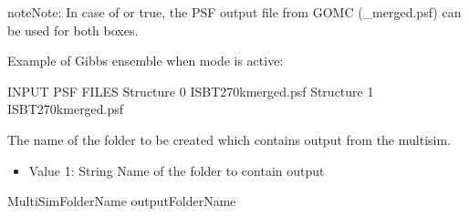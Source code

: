 \documentclass[letterpaper,10pt,english]{sphinxmanual}
\begin{document}
\begin{description}
\begin{sphinxadmonition}{note}{Note:}
In case of  or  true, the PSF output file from GOMC (\_merged.psf) can be used for both boxes.
\end{sphinxadmonition}

Example of Gibbs ensemble when  mode is active:

\begin{sphinxVerbatim}[commandchars=\\\{\}]
\PYGZsh{}\PYGZsh{}\PYGZsh{}\PYGZsh{}\PYGZsh{}\PYGZsh{}\PYGZsh{}\PYGZsh{}\PYGZsh{}\PYGZsh{}\PYGZsh{}\PYGZsh{}\PYGZsh{}\PYGZsh{}\PYGZsh{}\PYGZsh{}\PYGZsh{}\PYGZsh{}\PYGZsh{}\PYGZsh{}\PYGZsh{}\PYGZsh{}\PYGZsh{}\PYGZsh{}\PYGZsh{}\PYGZsh{}\PYGZsh{}\PYGZsh{}\PYGZsh{}\PYGZsh{}\PYGZsh{}\PYGZsh{}\PYGZsh{}
\PYGZsh{} INPUT PSF FILES
\PYGZsh{}\PYGZsh{}\PYGZsh{}\PYGZsh{}\PYGZsh{}\PYGZsh{}\PYGZsh{}\PYGZsh{}\PYGZsh{}\PYGZsh{}\PYGZsh{}\PYGZsh{}\PYGZsh{}\PYGZsh{}\PYGZsh{}\PYGZsh{}\PYGZsh{}\PYGZsh{}\PYGZsh{}\PYGZsh{}\PYGZsh{}\PYGZsh{}\PYGZsh{}\PYGZsh{}\PYGZsh{}\PYGZsh{}\PYGZsh{}\PYGZsh{}\PYGZsh{}\PYGZsh{}\PYGZsh{}\PYGZsh{}\PYGZsh{}
Structure   0   ISB\PYGZus{}T\PYGZus{}270\PYGZus{}k\PYGZus{}merged.psf
Structure   1   ISB\PYGZus{}T\PYGZus{}270\PYGZus{}k\PYGZus{}merged.psf
\end{sphinxVerbatim}

\item[{\sphinxcode{\sphinxupquote{MultiSimFolderName}}}] \leavevmode
The name of the folder to be created which contains output from the multisim.
\begin{itemize}
\item {} 
Value 1: String \sphinxhyphen{} Name of the folder to contain output

\end{itemize}

\begin{sphinxVerbatim}[commandchars=\\\{\}]
MultiSimFolderName  outputFolderName
\end{sphinxVerbatim}

\end{description}
\end{document}
